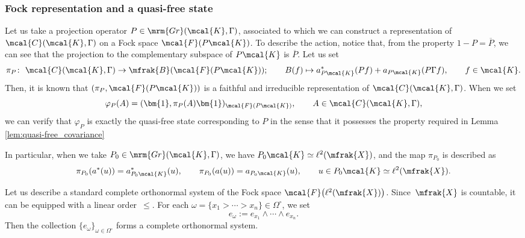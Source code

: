 \subsubsection{Fock representation and a quasi-free state}
Let us take a projection operator $P\in\mrm{Gr}(\mcal{K},\Gamma)$, associated to which we can construct a representation of $\mcal{C}(\mcal{K},\Gamma)$ on a Fock space $\mcal{F}(P\mcal{K})$.
To describe the action, notice that, from the property $1-P=\overline{P}$, we can see that the projection to the complementary subspace of $P\mcal{K}$ is $\overline{P}$.
Let us set
\begin{equation*}
	\pi_{P}\colon \ \mcal{C}(\mcal{K},\Gamma)\to \mfrak{B}(\mcal{F}(P\mcal{K}));\qquad B(f)\mapsto a_{P\mcal{K}}^{\ast}(Pf)+a_{P\mcal{K}}(P\Gamma f),\qquad f\in\mcal{K}.
\end{equation*}
Then, it is known that $(\pi_{P},\mcal{F}(P\mcal{K}))$ is a faithful and irreducible representation of $\mcal{C}(\mcal{K},\Gamma)$.
When we set
\begin{equation*}
	\varphi_{P}(A)=(\bm{1}, \pi_{P}(A)\bm{1})_{\mcal{F}(P\mcal{K})},\qquad A\in \mcal{C}(\mcal{K},\Gamma),
\end{equation*}
we can verify that $\varphi_{P}$ is exactly the quasi-free state corresponding to $P$ in the sense that it possesses the property required in Lemma \ref{lem:quasi-free_covariance}

In particular, when we take $P_{0}\in\mrm{Gr}(\mcal{K},\Gamma)$, we have $P_{0}\mcal{K}\simeq \ell^{2}(\mfrak{X})$, and the map $\pi_{P_{0}}$ is described as
\begin{equation*}
	\pi_{P_{0}}(a^{\ast}(u))=a_{P_{0}\mcal{K}}^{\ast}(u),\qquad \pi_{P_{0}}(a(u))=a_{P_{0}\mcal{K}}(u),\qquad u\in P_{0}\mcal{K}\simeq \ell^{2}(\mfrak{X}).
\end{equation*}

Let us describe a standard complete orthonormal system of the Fock space $\mcal{F}\big(\ell^{2}(\mfrak{X})\big)$. Since~$\mfrak{X}$ is countable, it can be equipped with a linear order~$\le$. For each $\omega=\{x_{1}>\cdots>x_{n}\}\in\Omega^{\circ}$, we set
\begin{equation*}
	e_{\omega}:=e_{x_{1}}\wedge\cdots \wedge e_{x_{n}}.
\end{equation*}
Then the collection $\{e_{\omega}\}_{\omega\in\Omega^{\circ}}$ forms a complete orthonormal system.

